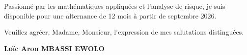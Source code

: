 \documentclass[a4paper,11pt]{article}
\begin{document}
\vspace{0.8em}

Passionn\'e par les math\'ematiques appliqu\'ees et l'analyse de risque, je suis disponible pour une alternance de 12 mois \`a partir de septembre 2026.

\vspace{1.5em}
\noindent Veuillez agr\'eer, Madame, Monsieur, l'expression de mes salutations distingu\'ees.

\vspace{2em}
\noindent \textbf{Lo\"ic Aron MBASSI EWOLO}
\end{document}
